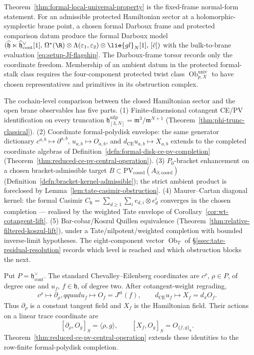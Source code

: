 \documentclass[11pt]{memoir}
\begin{document}
Theorem~\ref{thm:formal-local-universal-property} is the fixed-frame
normal-form statement.  For an admissible protected Hamiltonian sector
at a holomorphic-symplectic brane point, a chosen formal Darboux frame
and protected comparison datum produce the formal Darboux model
\((\widehat{\mathfrak h}\ltimes\widehat{\mathfrak h}^\vee_{\mathrm{cont}}[1],\,
\Omega^*(\R)\otimes\Lambda(\varepsilon_1,\varepsilon_2)\otimes
\lie{gl}_N[1],\,[\bar c])\) with the bulk-to-brane evaluation
\eqref{eq:setup-Jf-flagship}.  The Darboux-frame torsor records only
the coordinate freedom.  Membership of an ambient datum in the
protected formal-stalk class requires the four-component protected
twist class \(\operatorname{Ob}^{\mathrm{univ}}_{p,X}\) to have
chosen representatives and primitives in its obstruction complex.

  The cochain-level comparison between the closed Hamiltonian sector and
  the open brane observables has five parts.  (1)
  Finite-dimensional cotangent CE/PV identification on every truncation
  \(\mathfrak h^{\mathrm{nilp}}_{[3,N]}=\mathfrak m^3/\mathfrak m^{N+1}\)
(Theorem~\ref{thm:phi-trunc-classical}).  (2) Coordinate
formal-polydisk envelope: the same generator dictionary
\(c^{a,b}\mapsto\partial^{a,b}\), \(u_{a,b}\mapsto O_{a,b}\), and
\(d_{\mathrm{CE}}u_{a,b}\mapsto X_{a,b}\) extends to
the completed coordinate algebras of
Definition~\ref{defn:formal-disk-ce-pv-completion}
(Theorem~\ref{thm:reduced-ce-pv-central-operation}).  (3)
\(P_0\)-bracket enhancement on a chosen bracket-admissible target
\(B\subset\mathrm{PV}_{\mathrm{coord}}(A_{\partial,\mathrm{coord}})\)
(Definition~\ref{defn:bracket-kernel-admissible}); the strict ambient
product is foreclosed by Lemma~\ref{lem:tate-casimir-obstruction}.
(4) Maurer--Cartan diagonal kernel: the formal Casimir
\(C_{\mathfrak h}=\sum_{d\ge1}\sum_i e_{d,i}\otimes e^i_d\) converges
in the chosen completion --- realised by the weighted Tate envelope of
  Corollary~\ref{cor:wt-cotangent-lift}.  (5) Bar-cobar/Koszul Quillen
  equivalence (Theorem~\ref{thm:relative-filtered-koszul-lift}), under a
Tate/nilpotent/weighted completion with bounded inverse-limit
hypotheses.  The eight-component vector
\(\operatorname{Ob}_T\) of \S\ref{ssec:tate-residual-resolution}
records which level is reached and which obstruction blocks the next.

\begin{rmk}
\label{rmk:type-discipline-cf-uf}
  Put \(P=\mathfrak h^\vee_{\mathrm{cont}}\).  The standard
  Chevalley--Eilenberg coordinates are \(c^\rho\), \(\rho\in P\), of
  degree one and \(u_f\), \(f\in\mathfrak h\), of degree two.  After
  cotangent-weight regrading,
  \[
    c^\rho\longmapsto\partial_\rho,qquad
    u_f\longmapsto O_f=J^{\mathrm{st}}(f),
    \qquad
    d_{\mathrm{CE}}u_f\longmapsto X_f=d_\pi O_f.
  \]
  Thus \(\partial_\rho\) is a constant tangent field and \(X_f\) is
  the Hamiltonian field.  Their actions on a linear trace coordinate are
  \[
    [\partial_\rho,O_g]_S=\langle\rho,g\rangle,
    \qquad
    [X_f,O_g]_S=O_{\{f,g\}_{\mathfrak h}}.
  \]
  Theorem~\ref{thm:reduced-ce-pv-central-operation} extends these
  identities to the row-finite formal-polydisk completion.
\end{rmk}
\end{document}
